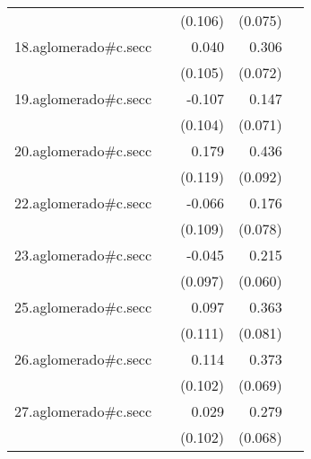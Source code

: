 {\begin{longtable}{l*{4}{D{.}{.}{-1}}}
            &                     &     (0.106)         &     (0.075)         &                     \\
\addlinespace
18.aglomerado#c.secc&                     &       0.040         &       0.306\sym{***}&                     \\
            &                     &     (0.105)         &     (0.072)         &                     \\
\addlinespace
19.aglomerado#c.secc&                     &      -0.107         &       0.147\sym{*}  &                     \\
            &                     &     (0.104)         &     (0.071)         &                     \\
\addlinespace
20.aglomerado#c.secc&                     &       0.179         &       0.436\sym{***}&                     \\
            &                     &     (0.119)         &     (0.092)         &                     \\
\addlinespace
22.aglomerado#c.secc&                     &      -0.066         &       0.176\sym{*}  &                     \\
            &                     &     (0.109)         &     (0.078)         &                     \\
\addlinespace
23.aglomerado#c.secc&                     &      -0.045         &       0.215\sym{***}&                     \\
            &                     &     (0.097)         &     (0.060)         &                     \\
\addlinespace
25.aglomerado#c.secc&                     &       0.097         &       0.363\sym{***}&                     \\
            &                     &     (0.111)         &     (0.081)         &                     \\
\addlinespace
26.aglomerado#c.secc&                     &       0.114         &       0.373\sym{***}&                     \\
            &                     &     (0.102)         &     (0.069)         &                     \\
\addlinespace
27.aglomerado#c.secc&                     &       0.029         &       0.279\sym{***}&                     \\
            &                     &     (0.102)         &     (0.068)         &                     \\

\end{longtable}}
